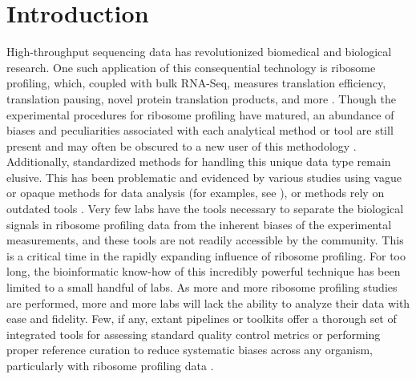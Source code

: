 \documentclass[10pt, oneside]{article}
\begin{document}
\setlength{\parindent}{2em}

\section*{Introduction}
High-throughput sequencing data has revolutionized biomedical and biological research. One such application of this consequential technology is ribosome profiling, which, coupled with bulk RNA-Seq, measures translation efficiency, translation pausing, novel protein translation products, and more \cite{ingolia_science, riboseq_overview, ingolia_meth}. Though the experimental procedures for ribosome profiling have matured, an abundance of biases and peculiarities associated with each analytical method or tool are still present and may often be obscured to a new user of this methodology \cite{gerashchenko_nar, analysis_biases, riboseq_biases, riboseq_biases2, riboseq_biases3}. Additionally, standardized methods for handling this unique data type remain elusive. This has been problematic and evidenced by various studies using vague or opaque methods for data analysis (for examples, see \cite{isrib_riboseq, scripts_1, scripts_2, scripts_3, scripts_4}), or methods rely on outdated tools \cite{analysis_biases}. Very few labs have the tools necessary to separate the biological signals in ribosome profiling data from the inherent biases of the experimental measurements, and these tools are not readily accessible by the community. This is a critical time in the rapidly expanding influence of ribosome profiling. For too long, the bioinformatic know-how of this incredibly powerful technique has been limited to a small handful of labs. As more and more ribosome profiling studies are performed, more and more labs will lack the ability to analyze their data with ease and fidelity. Few, if any, extant pipelines or toolkits offer a thorough set of integrated tools for assessing standard quality control metrics or performing proper reference curation to reduce systematic biases across any organism, particularly with ribosome profiling data \cite{galaxy, ribogalaxy, nextflow_pipeline, dnanexus_pipeline, riboviz}.\par
\end{document}
